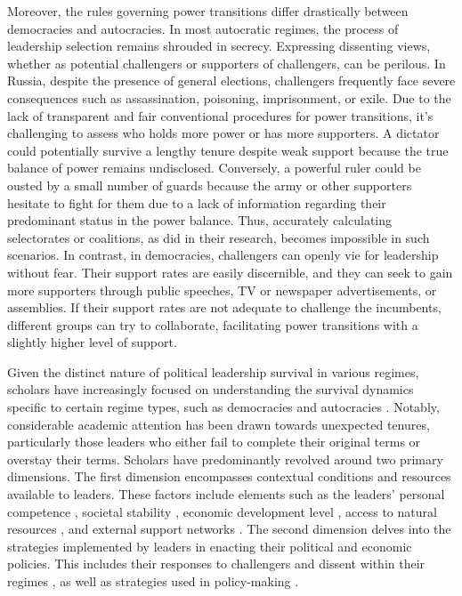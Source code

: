 \documentclass[
  12pt,
  a4paper,
  12pt]{article}
\begin{document}
Moreover, the rules governing power transitions differ drastically
between democracies and autocracies. In most autocratic regimes, the
process of leadership selection remains shrouded in secrecy. Expressing
dissenting views, whether as potential challengers or supporters of
challengers, can be perilous. In Russia, despite the presence of general
elections, challengers frequently face severe consequences such as
assassination, poisoning, imprisonment, or exile. Due to the lack of
transparent and fair conventional procedures for power transitions, it's
challenging to assess who holds more power or has more supporters. A
dictator could potentially survive a lengthy tenure despite weak support
because the true balance of power remains undisclosed. Conversely, a
powerful ruler could be ousted by a small number of guards because the
army or other supporters hesitate to fight for them due to a lack of
information regarding their predominant status in the power balance.
Thus, accurately calculating selectorates or coalitions, as
\citet{buenodemesquita2003} did in their research, becomes impossible in
such scenarios. In contrast, in democracies, challengers can openly vie
for leadership without fear. Their support rates are easily discernible,
and they can seek to gain more supporters through public speeches, TV or
newspaper advertisements, or assemblies. If their support rates are not
adequate to challenge the incumbents, different groups can try to
collaborate, facilitating power transitions with a slightly higher level
of support.

Given the distinct nature of political leadership survival in various
regimes, scholars have increasingly focused on understanding the
survival dynamics specific to certain regime types, such as democracies
\citep{svolik2014} and autocracies \citep{davenport2021}. Notably,
considerable academic attention has been drawn towards unexpected
tenures, particularly those leaders who either fail to complete their
original terms or overstay their terms. Scholars have predominantly
revolved around two primary dimensions. The first dimension encompasses
contextual conditions and resources available to leaders. These factors
include elements such as the leaders' personal competence
\citep{yu2016}, societal stability \citep{arriola2009}, economic
development level \citep{palmer1999, williams2011}, access to natural
resources \citep{smith2004, quirozflores2012}, and external support
networks \citep{licht2009, wright2008, thyne2017}. The second dimension
delves into the strategies implemented by leaders in enacting their
political and economic policies. This includes their responses to
challengers and dissent within their regimes
\citep{escribà-folch2013, davenport2021}, as well as strategies used in
policy-making \citep{gandhi2007, morrison2009}.
\end{document}
